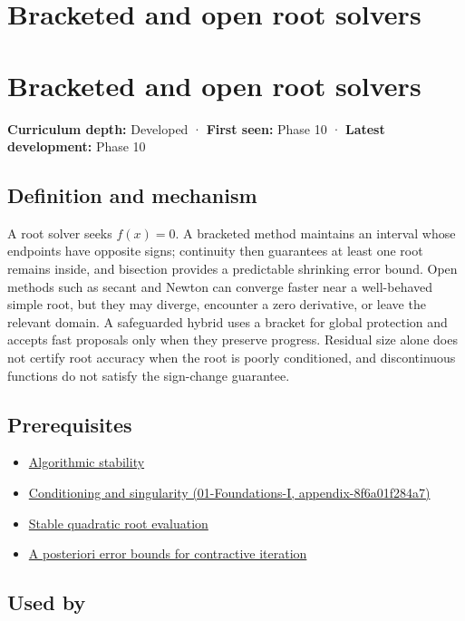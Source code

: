 \hypertarget{appendix-f63eb850796d}{}
\section*{Bracketed and open root solvers}
\section{Bracketed and open root solvers}\label{bracketed-and-open-root-solvers}

\textbf{Curriculum depth:} Developed · \textbf{First seen:} Phase 10 · \textbf{Latest development:} Phase 10

\subsection{Definition and mechanism}\label{definition-and-mechanism}

A root solver seeks \(f(x)=0\). A bracketed method maintains an interval whose endpoints have opposite signs; continuity then guarantees at least one root remains inside, and bisection provides a predictable shrinking error bound. Open methods such as secant and Newton can converge faster near a well-behaved simple root, but they may diverge, encounter a zero derivative, or leave the relevant domain. A safeguarded hybrid uses a bracket for global protection and accepts fast proposals only when they preserve progress. Residual size alone does not certify root accuracy when the root is poorly conditioned, and discontinuous functions do not satisfy the sign-change guarantee.

\subsection{Prerequisites}\label{prerequisites}

\begin{itemize}
\tightlist
\item
  \hyperref[appendix-aa2bf0d79639]{Algorithmic stability}
\item
  \href{}{Conditioning and singularity (01-Foundations-I, appendix-8f6a01f284a7)}
\item
  \hyperref[appendix-b9afba7f63e5]{Stable quadratic root evaluation}
\item
  \hyperref[appendix-d83b0ad1be7f]{A posteriori error bounds for contractive iteration}
\end{itemize}

\subsection{Used by}\label{used-by}


